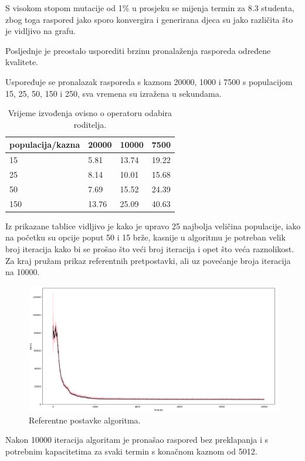 \documentclass[times, utf8, zavrsni]{fer}
\begin{document}
S visokom stopom mutacije od 1\% u prosjeku se mijenja termin za 8.3 studenta, zbog toga raspored jako sporo konvergira i generirana djeca su jako različita što je vidljivo na grafu.

Posljednje je preostalo usporediti brzinu pronalaženja rasporeda određene kvalitete. 
\newpage

Uspoređuje se pronalazak rasporeda s kaznom 20000, 1000 i 7500 s populacijom 15, 25, 50, 150 i 250, sva vremena su izražena u sekundama.

\begin{table}[htb]
\caption{Vrijeme izvođenja ovisno o operatoru odabira roditelja.}
\label{tbl:iter-roditelj}
\centering
\begin{tabular}{llll} \hline
populacija/kazna & 20000 &  10000 & 7500\\ \hline
15 & 5.81 & 13.74 & 19.22\\
25 & 8.14 & 10.01 & 15.68\\
50 & 7.69 & 15.52 & 24.39\\
150 & 13.76 & 25.09 & 40.63\\ \hline
\end{tabular}
\end{table}

Iz prikazane tablice vidljivo je kako je upravo 25 najbolja veličina populacije, iako na početku su opcije poput 50 i 15 brže, kasnije u algoritmu je potreban velik broj iteracija kako bi se prošao što veći broj iteracija i opet što veća raznolikost. Za kraj pružam prikaz referentnih pretpostavki, ali uz povećanje broja iteracija na 10000.

\begin{figure}[htb]
\centering
\includegraphics[width=15cm]{images/final.png}
\caption{Referentne postavke algoritma.}
\label{fig:final}
\end{figure}

Nakon 10000 iteracija algoritam je pronašao raspored bez preklapanja i s potrebnim kapacitetima za svaki termin s konačnom kaznom od 5012.
\end{document}
